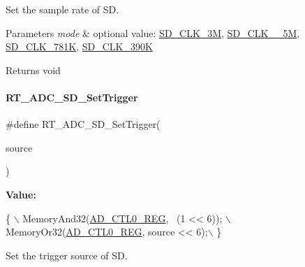 Set the sample rate of SD. 


\begin{DoxyParams}{Parameters}
{\em mode} & optional value\+: \mbox{\hyperlink{a00002_aebc3424fa91b715741f0320561ecfbb0a720c5991be73063f5ab035440f26b486}{S\+D\+\_\+\+C\+L\+K\+\_\+3M}}, \mbox{\hyperlink{a00002_aebc3424fa91b715741f0320561ecfbb0a5241c8457df3f987f10797b36db20771}{S\+D\+\_\+\+C\+L\+K\+\_\+\_\+5M}}, \mbox{\hyperlink{a00002_aebc3424fa91b715741f0320561ecfbb0a37bbada3115f676b49cc087c5caac0d3}{S\+D\+\_\+\+C\+L\+K\+\_\+781K}}, \mbox{\hyperlink{a00002_aebc3424fa91b715741f0320561ecfbb0ace583ebd6e97c856a883187711ea4226}{S\+D\+\_\+\+C\+L\+K\+\_\+390K}} \\
\hline
\end{DoxyParams}
\begin{DoxyReturn}{Returns}
void 
\end{DoxyReturn}
\mbox{\label{a00002_a11bf38478bd196acd1f179115e714dfc}} 
\paragraph{\texorpdfstring{R\+T\+\_\+\+A\+D\+C\+\_\+\+S\+D\+\_\+\+Set\+Trigger}{RT\_ADC\_SD\_SetTrigger}}
{\footnotesize\ttfamily \#define R\+T\+\_\+\+A\+D\+C\+\_\+\+S\+D\+\_\+\+Set\+Trigger(\begin{DoxyParamCaption}\item[{}]{source }\end{DoxyParamCaption})}

{\bfseries Value\+:}
\begin{DoxyCode}
\{                                        \(\backslash\)
        MemoryAnd32(\mbox{\hyperlink{a00020_a7c90725a1b307a000a44211bcb115a47}{AD\_CTL0\_REG}}, ~(1 << 6)); \(\backslash\)
        MemoryOr32(\mbox{\hyperlink{a00020_a7c90725a1b307a000a44211bcb115a47}{AD\_CTL0\_REG}}, source << 6);\(\backslash\)
    \}
\end{DoxyCode}


Set the trigger source of SD. 



